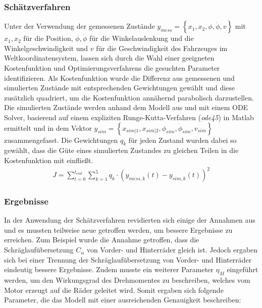 \subsubsection{Schätzverfahren}
Unter der Verwendung der gemessenen Zustände $y_{mess} = \left \{x_1, x_2, \phi, \dot{\phi}, v  \right \}$ mit $x_1, x_2$ für die Position, $\phi, \dot{\phi}$ für die Winkelauslenkung und die Winkelgeschwindigkeit und $v$ für die Geschwindigkeit des Fahrzeuges im Weltkoordinatensystem, lassen sich durch die Wahl einer geeigneten Kostenfunktion und Optimierungsverfahrens die gesuchten Parameter identifizieren. Als Kostenfunktion wurde die Differenz aus gemessenen und simulierten Zustände mit entsprechenden Gewichtungen gewählt und diese zusätzlich quadriert, um die Kostenfunktion annähernd parabolisch darzustellen. Die simulierten Zustände werden anhand dem Modell aus \cite{VikAnd} und mit einem ODE Solver, basierend auf einem expliziten Runge-Kutta-Verfahren (\textit{ode45}) in Matlab ermittelt und in dem Vektor $y_{sim} = \left \{x_{sim|1}, x_{sim|2}, \phi_{sim}, \dot{\phi}_{sim}, v_{sim}  \right \}$ zusammengefasst. Die Gewichtungen $q_k$ für jeden Zustand wurden dabei so gewählt, dass die Güte eines simulierten Zustandes zu gleichen Teilen in die Kostenfunktion mit einfließt.
\begin{align*}
J = \sum_{t=0}^{t_{end}}\sum_{k = 1}^{5} q_k\cdot  \left (y_{mess, k}\left ( t \right ) - y_{sim, k}\left ( t \right )  \right )^2
\end{align*}

\subsubsection{Ergebnisse}
In der Anwendung der Schätzverfahren revidierten sich einige der Annahmen aus \cite{VikAnd} und es mussten teilweise neue getroffen werden, um bessere Ergebnisse zu erreichen. Zum Beispiel wurde die Annahme getroffen, dass die Schräglaufübersetzung $C_{\alpha}$ von Vorder- und Hinterräder gleich ist. Jedoch ergaben sich bei einer Trennung der Schräglaufübersetzung von Vorder- und Hinterräder eindeutig bessere Ergebnisse. Zudem musste ein weiterer Parameter $\eta_M$ eingeführt werden, um den Wirkungsgrad des Drehmomentes zu beschreiben, welches vom Motor erzeugt auf die Räder geleitet wird. Somit ergaben sich folgende Parameter, die das Modell mit einer ausreichenden Genauigkeit beschreiben: 

